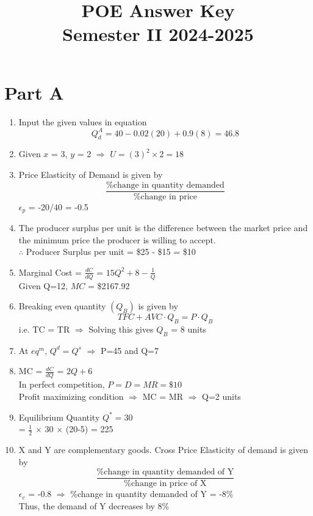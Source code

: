 \documentclass{article}
\title{\vspace{-2cm} \textbf{POE Answer Key \\ Semester II 2024-2025}}
\begin{document}
\date{}
\maketitle
\vspace{-1.5cm}
\noindent\hrulefill
\section*{Part A}
\begin{enumerate}
    \item 
        Input the given values in equation 
        \[
        Q_d^A = 40  - 0.02(20) + 0.9(8) = 46.8
        \]
    \item 
        Given
        $x$ = 3,
        $y$ = 2 $\Rightarrow$
        $U = (3)^2\times2 = 18$
    \item
        Price Elasticity of Demand is given by 
        \[\frac{\text{\%change in quantity demanded}}{\text{\%change in price}}\]
        $\epsilon_p$ = -20/40 = -0.5
    \item 
        The producer surplus per unit is the difference between the market price and the minimum price the producer is willing to accept. \\
        $\therefore$ Producer Surplus per unit = \$25 - \$15 = \$10
    \item 
        Marginal Cost = \(\frac{dC}{dQ}\) = \(15Q^2 + 8 - \frac{1}{Q}\) \\
        Given Q=12, $MC$ = \$2167.92
    \item 
        Breaking even quantity $(Q_B)$ is given by 
        \[
        TFC + AVC \cdot Q_B = P \cdot Q_B
        \]
        i.e. TC = TR $\Rightarrow$ Solving this gives $Q_B$ = 8 units
    \item 
        At $eq^m$, $Q^d=Q^s$ $\Rightarrow$ P=45 and Q=7 
    \item 
        MC = \(\frac{dC}{dQ}\) = $2Q+6$ \\
        In perfect competition, $P=D=MR=\$10$ \\ 
        Profit maximizing condition $\Rightarrow$ MC = MR $\Rightarrow$ Q=2 units
    \item 
        Equilibrium Quantity $Q^* = 30$\\
         = \(\frac{1}{2}\) $\times$ 30 $\times$ (20-5) = 225
    \item 
        X and Y are complementary goods. Cross Price Elasticity of demand is given by
        \[\frac{\text{\%change in quantity demanded of Y}}{\text{\%change in price of X}}\]
        $\epsilon_c$ = -0.8 $\Rightarrow$ \%change in quantity demanded of Y = -8\% \\
        Thus, the demand of Y decreases by 8\%
\end{enumerate}
\end{document}
